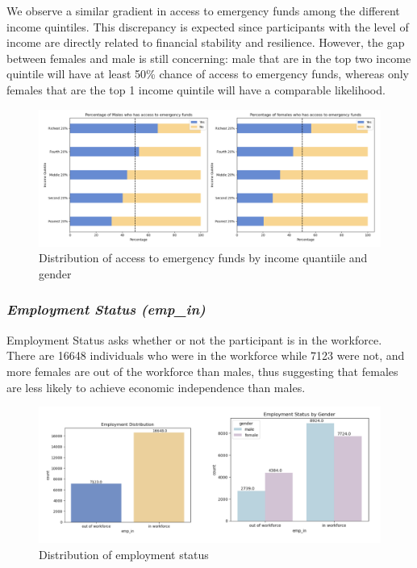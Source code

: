 \documentclass[12pt]{article}
\begin{document}
We observe a similar gradient in access to emergency funds among the
different income quintiles. This discrepancy is expected since
participants with the level of income are directly related to financial
stability and resilience. However, the gap between females and male is
still concerning: male that are in the top two income quintile will have
at least 50\% chance of access to emergency funds, whereas only females
that are the top 1 income quintile will have a comparable likelihood.

\begin{figure}

{\centering \includegraphics[width=1\linewidth]{graphs/employ_graph7} 

}

\caption{Distribution of access to emergency funds by income quantiile and gender}\label{fig:unnamed-chunk-10}
\end{figure}

\hypertarget{employment-status-emp_in}{%
\subsubsection{\texorpdfstring{\emph{Employment Status
(emp\_in)}}{Employment Status (emp\_in)}}\label{employment-status-emp_in}}

Employment Status asks whether or not the participant is in the
workforce. There are 16648 individuals who were in the workforce while
7123 were not, and more females are out of the workforce than males,
thus suggesting that females are less likely to achieve economic
independence than males.

\begin{figure}

{\centering \includegraphics[width=1\linewidth]{graphs/employ_graph8} 

}

\caption{Distribution of employment status}\label{fig:unnamed-chunk-11}
\end{figure}
\end{document}

